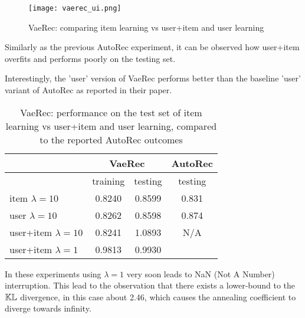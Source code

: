 \begin{figure}[H]
\centering
\texttt{[image: vaerec\_ui.png]}
\caption{VaeRec: comparing item learning vs user+item and user learning}
\label{vaerec_ui_fig}
\end{figure}

Similarly as the previous AutoRec experiment, it can be observed how user+item overfits and performs poorly on the testing
set.

Interestingly, the 'user' version of VaeRec performs better than the baseline 'user' variant
of AutoRec as reported in their paper.

\begin{table}[H]
\centering
\caption{VaeRec: performance on the test set of item learning vs user+item and user learning, compared to the reported AutoRec outcomes \cite{Sedhain2015}}
 \begin{tabular}{||l | c c |c||} 
 \hline
 & \multicolumn{2}{c}{VaeRec} & AutoRec \\ \hline
 & training & testing & testing \\ \hline
item $\lambda=10$& 0.8240&0.8599 & 0.831 \\
user $\lambda=10$ & 0.8262&0.8598 & 0.874 \\
user+item $\lambda=10$ & 0.8241 & 1.0893 & N/A\\
user+item $\lambda=1$ &0.9813 & 0.9930 &\\
\hline
\end{tabular}
\end{table}

In these experiments using $\lambda=1$ very soon leads to NaN (Not A Number) 
interruption. This lead to the observation that there exists a lower-bound to the
$\mathbb{KL}$ divergence, in this case about 2.46, which causes the annealing coefficient
to diverge towards infinity.
